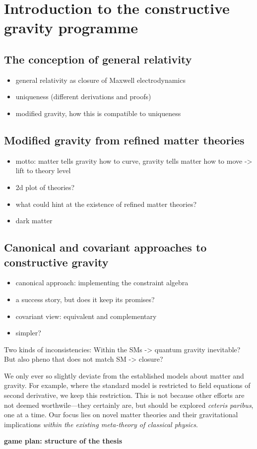 \chapter{Introduction to the constructive gravity programme}

\section{The conception of general relativity}

\begin{itemize}
\item general relativity as closure of Maxwell electrodynamics
\item uniqueness (different derivations and proofs)
\item modified gravity, how this is compatible to uniqueness
\end{itemize}

\section{Modified gravity from refined matter theories}

\begin{itemize}
\item motto: matter tells gravity how to curve, gravity tells matter how to move -> lift to theory level
\item 2d plot of theories?
\item what could hint at the existence of refined matter theories?
\item dark matter
\end{itemize}

\section{Canonical and covariant approaches to constructive gravity}

\begin{itemize}
\item canonical approach: implementing the constraint algebra
\item a success story, but does it keep its promises?
\item covariant view: equivalent and complementary
\item simpler?
\end{itemize}

Two kinds of inconsistencies: Within the SMs -> quantum gravity inevitable? But also pheno that does not match SM -> closure?

We only ever so slightly deviate from the established models about matter and gravity. For example, where the standard model is restricted to field equations of second derivative, we keep this restriction. This is not because other efforts are not deemed worthwile---they certainly are, but should be explored \emph{ceteris paribus}, one at a time. Our focus lies on novel matter theories and their gravitational implications \emph{within the existing meta-theory of classical physics}.

\textbf{game plan: structure of the thesis}
